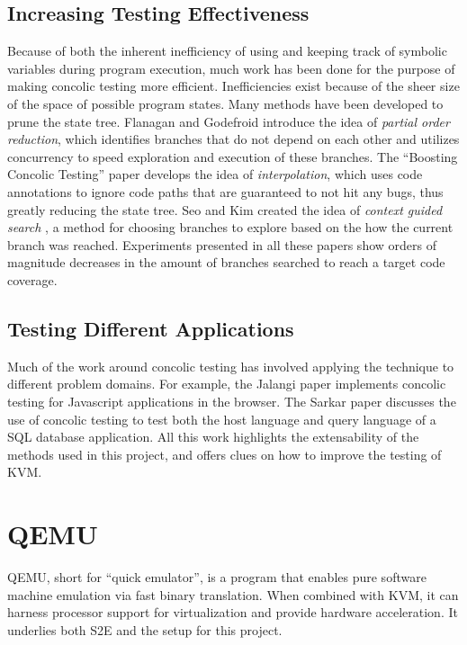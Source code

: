 \documentclass[11pt]{article}
\begin{document}
\subsection{Increasing Testing Effectiveness}
Because of both the inherent inefficiency of using and keeping track of symbolic
variables during program execution, much work has been done for the purpose of
making concolic testing more efficient. Inefficiencies exist because of the
sheer size of the space of possible program states. Many methods have been
developed to prune the state tree. Flanagan and Godefroid \cite{Godefroid} introduce the idea
of \textit{partial order reduction}, which identifies branches that do not
depend on each other and utilizes concurrency to speed exploration and execution
of these branches. The ``Boosting Concolic Testing'' paper \cite{Jaffar} develops the idea
of \textit{interpolation}, which uses code annotations to ignore code paths that
are guaranteed to not hit any bugs, thus greatly reducing the state tree. Seo
and Kim created the idea of \textit{context guided search} \cite{Seo}, a method for
choosing branches to explore based on the how the current branch was
reached. Experiments presented in all these papers show orders of magnitude
decreases in the amount of branches searched to reach a target code coverage. 

\subsection{Testing Different Applications}
Much of the work around concolic testing has involved applying the technique to
different problem domains. For example, the Jalangi paper \cite{Jalangi} implements concolic testing for
Javascript applications in the browser. The Sarkar paper \cite{Sarkar} discusses the use of
concolic testing to test both the host language and query language of a SQL
database application. All this work highlights the extensability of the methods
used in this project, and offers clues on how to improve the testing of KVM.

\section{QEMU}
QEMU, short for ``quick emulator'', is a program that enables pure software
machine emulation via fast binary translation. When combined with KVM, it can
harness processor support for virtualization and provide hardware
acceleration. It underlies both S2E and the setup for this project.
\end{document}
